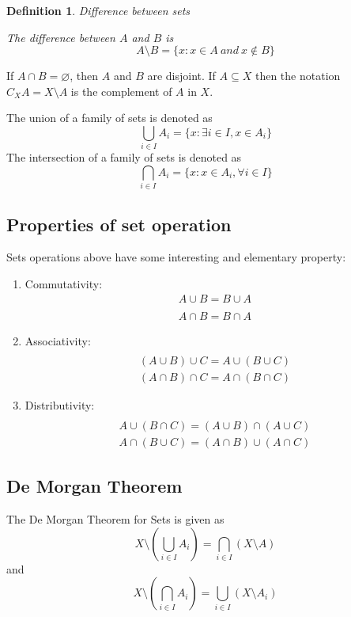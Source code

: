 \documentclass{book}
\newtheorem{Definition}{Definition}[section]
\numberwithin{identity}{subsection}
\numberwithin{Rule}{subsection}
\numberwithin{Theorem}{subsection}
\numberwithin{Definition}{subsection}
\begin{document}
\begin{Definition}
    Difference between sets

    The difference between $A$ and $B$ is $$A \setminus B =\{x: x\in A \: and \: x \notin B\}$$
\end{Definition}

If $A \cap B = \varnothing$, then $A$ and $B$ are disjoint. If $A \subseteq X$ then the notation $C_{X}A= X \setminus A$ is the complement of $A$ in $X$. 

The union of a family of sets is denoted as $$\bigcup_{i \in I} A_{i} = \{x: \exists i \in I, x \in A_{i}\}$$
The intersection of a family of sets is denoted as $$\bigcap_{i\in I} A_{i}=\{x: x\in A_{i}, \forall i \in I\}$$
\subsection{Properties of set operation}

Sets operations above have some interesting and elementary property:
\begin{enumerate}
   \item Commutativity: \begin{align}
A \cup B = B \cup A \\ \\
A \cap B = B \cap A
\end{align}
\item Associativity: \begin{align} \\
(A\cup B)\cup C = A \cup (B \cup C)  \\
(A \cap B) \cap C = A \cap (B \cap C)
\end{align}

\item Distributivity: \begin{align} \\
A \cup (B \cap C) = (A \cup B) \cap (A \cup C) \\
A \cap (B \cup C) = (A \cap B) \cup (A \cap C)
\end{align}

\end{enumerate}

\subsection{De Morgan Theorem}
The De Morgan Theorem for Sets is given as 
$$X\setminus \left(\bigcup_{i \in I} A_{i}  \right)=\bigcap_{i \in I} (X \setminus A)$$
and
$$X\setminus\left(\bigcap_{i \in I} A_{i}\right)= \bigcup_{i \in I} (X \setminus A_{i})$$
\end{document}
